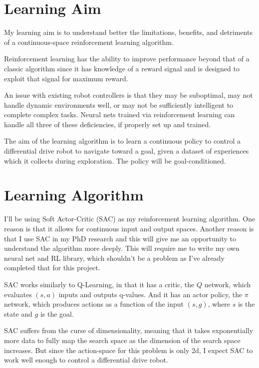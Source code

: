 \documentclass[11pt]{article}
\begin{document}
 
\singlespacing

\section{Learning Aim}

My learning aim is to understand better the limitations, benefits, and detriments of a continuous-space reinforcement learning algorithm. 

Reinforcement learning has the ability to improve performance beyond that of a classic algorithm since it has knowledge of a reward signal and is designed to exploit that signal for maximum reward.

An issue with existing robot controllers is that they may be suboptimal, may not handle dynamic environments well, or may not be sufficiently intelligent to complete complex tasks. Neural nets trained via reinforcement learning can handle all three of these deficiencies, if properly set up and trained.

The aim of the learning algorithm is to learn a continuous policy to control a differential drive robot to navigate toward a goal, given a dataset of experiences which it collects during exploration. The policy will be goal-conditioned. 

\section{Learning Algorithm}

I'll be using Soft Actor-Critic (SAC) as my reinforcement learning algorithm. One reason is that it allows for continuous input and output spaces. Another reason is that I use SAC in my PhD research and this will give me an opportunity to understand the algorithm more deeply. This will require me to write my own neural net and RL library, which shouldn't be a problem as I've already completed that for this project. 

SAC works similarly to Q-Learning, in that it has a critic, the $Q$ network, which evaluates $(s, a)$ inputs and outputs q-values. And it has an actor policy, the $\pi$ network, which produces actions as a function of the input $(s, g)$, where $s$ is the state and $g$ is the goal.

SAC suffers from the curse of dimensionality, meaning that it takes exponentially more data to fully map the search space as the dimension of the search space increases. But since the action-space for this problem is only 2d, I expect SAC to work well enough to control a differential drive robot.
\end{document}
